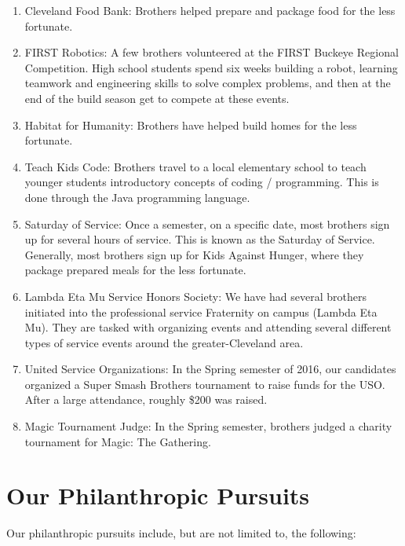 \begin{enumerate}
      \item Cleveland Food Bank: Brothers helped prepare and package food for the less fortunate.
      \item FIRST Robotics: A few brothers volunteered at the FIRST Buckeye Regional Competition. High school students spend six weeks building a robot, learning teamwork and engineering skills to solve complex problems, and then at the end of the build season get to compete at these events.
      \item Habitat for Humanity: Brothers have helped build homes for the less fortunate.
      \item Teach Kids Code: Brothers travel to a local elementary school to teach younger students introductory concepts of coding / programming. This is done through the Java programming language.
      \item Saturday of Service: Once a semester, on a specific date, most brothers sign up for several hours of service. This is known as the Saturday of Service. Generally, most brothers sign up for Kids Against Hunger, where they package prepared meals for the less fortunate.
      \item Lambda Eta Mu Service Honors Society: We have had several brothers initiated into the professional service Fraternity on campus (Lambda Eta Mu). They are tasked with organizing events and attending several different types of service events around the greater-Cleveland area.
      \item United Service Organizations: In the Spring semester of 2016, our candidates organized a Super Smash Brothers tournament to raise funds for the USO. After a large attendance, roughly \$200 was raised.
      \item Magic Tournament Judge: In the Spring semester, brothers judged a charity tournament for Magic: The Gathering.
      \end{enumerate}
      
    \section*{Our Philanthropic Pursuits}
      Our philanthropic pursuits include, but are not limited to, the following:
      
